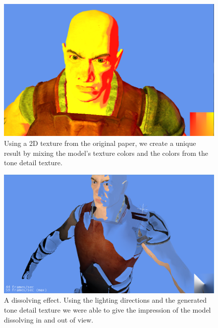 \documentclass[annual]{acmsiggraph}
\begin{document}
\begin{figure}[h]
  \centering
  \includegraphics[width=5.5in]{images/test}
  \caption{Using a 2D texture from the original paper, we create a unique result by mixing the model's texture colors and the colors from the tone detail texture.}
\end{figure}

\begin{figure}[h]
 \centering
 \includegraphics[width=5.5in]{images/dissolve}
 \caption{A dissolving effect. Using the lighting directions and the generated tone detail texture we were able to give the impression of the model dissolving in and out of view.}
 \label{fig:dissolve}
\end{figure}
\end{document}
